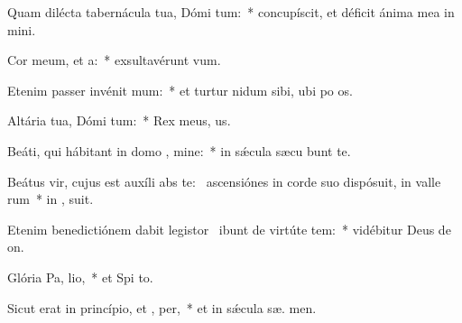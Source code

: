\item Quam dilécta tabernácula tua, Dómi tum:~* concupíscit, et déficit ánima mea in  mini.
\item Cor meum, et  a:~* exsultavérunt   vum.
\item Etenim passer invénit  mum:~* et turtur nidum sibi, ubi po  os.
\item Altária tua, Dómi tum:~* Rex meus,   us.
\item Beáti, qui hábitant in domo , mine:~* in sǽcula sæcu bunt te.
\item Beátus vir, cujus est auxíli abs te:~\pscross{} ascensiónes in corde suo dispósuit, in valle rum~* in ,  suit.
\item Etenim benedictiónem dabit legistor~\pscross{} ibunt de virtúte  tem:~* vidébitur Deus de  on.
\item Glória Pa,  lio,~* et Spi to.
\item Sicut erat in princípio, et ,  per,~* et in sǽcula sæ. men.
